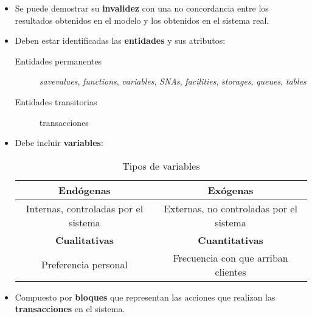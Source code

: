 \documentclass[12pt, a4paper, twoside]{paquetes-apunte/apunte}
\begin{document}
\begin{itemize}
  \item Se puede demostrar su \textbf{invalidez} con una no concordancia entre
    los resultados obtenidos en el modelo y los obtenidos en el sistema real.

  \item Deben estar identificadas las \textbf{entidades} y sus atributos:
  \begin{description}
    \item[Entidades permanentes] \emph{savevalues}, \emph{functions},
      \emph{variables}, \emph{SNAs}, \emph{facilities}, \emph{storages},
      \emph{queues}, \emph{tables}
    \item[Entidades transitorias] transacciones
  \end{description}

  \item Debe incluir \textbf{variables}:

  \begin{table}[h]
    \centering
    \begin{tabular}{|c|c|}
      \hline
      \textbf{Endógenas} & \textbf{Exógenas} \\
      \hline
      Internas, controladas por el sistema & Externas, no controladas por el sistema \\
      \hline
      \hline
      \textbf{Cualitativas} & \textbf{Cuantitativas} \\
      \hline
      Preferencia personal & Frecuencia con que arriban clientes \\
      \hline
    \end{tabular}
    \caption{Tipos de variables}
  \end{table}

  \item Compuesto por \textbf{bloques} que representan las acciones que realizan
    las \textbf{transacciones} en el sistema.
\end{itemize}
\end{document}
